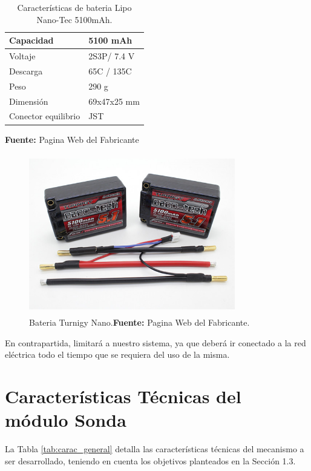  \newline
 \hfill
\begin{table}[t]
\protect\caption[Caracter\'isticas de bateria Lipo Nano-Tech ]{Caracter\'isticas de bateria Lipo Nano-Tec 5100mAh.}
\label{tab:caract_bat}
\begin{center}
\begin{tabular}{|l|l|}
\hline
Capacidad    &  5100 mAh \\
\hline
Voltaje      &  2S3P/ 7.4 V \\
\hline
Descarga &  65C / 135C \\
\hline
Peso  & 290 g\\
\hline
Dimensi\'on   &  69x47x25 mm\\
\hline
Conector equilibrio	& JST\\
\hline
\end{tabular}
\vspace{5mm}
\newline
\hfill \textbf{Fuente:} Pagina Web del Fabricante\cite{bateria}
\end{center}
\end{table}




\begin{figure}[H]
\centering
	\includegraphics[width=90mm, height=70mm]{Imagenes/2021/imag29.jpg}%
    \caption[Bateria Turnigy Nano]{Bateria Turnigy Nano.\textbf{Fuente: } Pagina Web del Fabricante\cite{bateria}.}
	\label{fig:4.17}
\end{figure}



 En contrapartida, limitará a nuestro sistema, ya que deberá ir conectado a la red eléctrica todo el tiempo que se requiera del uso de la misma.



\section[Características Técnicas de los módulos]{Características Técnicas del módulo Sonda}
La Tabla \ref{tab:carac_general} detalla las características técnicas del mecanismo a ser desarrollado, teniendo en cuenta los objetivos planteados en la Sección 1.3.

